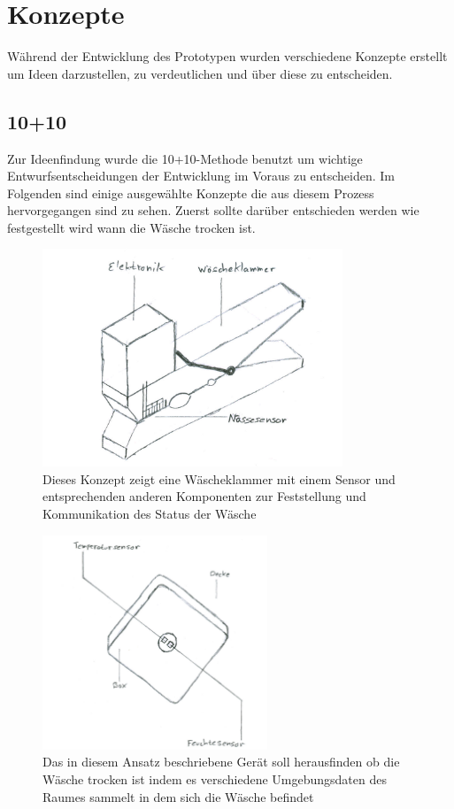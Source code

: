\section{Konzepte}
Während der Entwicklung des Prototypen wurden verschiedene Konzepte erstellt um Ideen darzustellen, zu  verdeutlichen und über diese zu entscheiden.
\subsection{10+10}
Zur Ideenfindung wurde die 10+10-Methode benutzt um wichtige Entwurfsentscheidungen der Entwicklung im Voraus zu entscheiden. Im Folgenden sind einige ausgewählte Konzepte die aus diesem Prozess hervorgegangen sind zu sehen. Zuerst sollte darüber entschieden werden wie festgestellt wird wann die Wäsche trocken ist. 
\begin{figure}[htb] 
	\centerline{\includegraphics*[width=0.8\textwidth]{./10+10/Concept/01-klammer}}
	\caption{Dieses Konzept zeigt eine Wäscheklammer mit einem Sensor und entsprechenden anderen Komponenten zur Feststellung und Kommunikation des Status der Wäsche} 
	\label{10+10_klammer}
\end{figure}
\begin{figure}[htb] 
	\centerline{\includegraphics*[width=0.6\textwidth]{./10+10/Concept/02-extern}}
	\caption{Das in diesem Ansatz beschriebene Gerät soll herausfinden ob die Wäsche trocken ist indem es verschiedene Umgebungsdaten des Raumes sammelt in dem sich die Wäsche befindet}
	\label{10+10_extern}
\end{figure}
